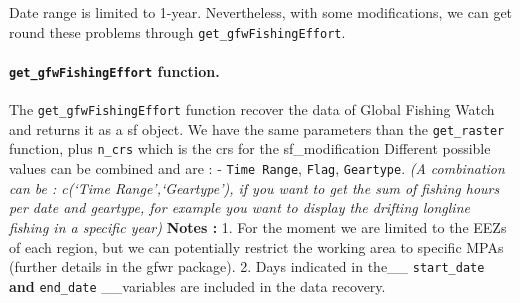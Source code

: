 \documentclass[
]{article}
\begin{document}
Date range is limited to 1-year. Nevertheless, with some modifications,
we can get round these problems through \texttt{get\_gfwFishingEffort}.

\hypertarget{get_gfwfishingeffort-function.}{%
\paragraph{\texorpdfstring{\texttt{get\_gfwFishingEffort}
function.}{get\_gfwFishingEffort function.}}\label{get_gfwfishingeffort-function.}}

The \texttt{get\_gfwFishingEffort} function recover the data of Global
Fishing Watch and returns it as a sf object. We have the same parameters
than the \texttt{get\_raster} function, plus \texttt{n\_crs} which is
the crs for the sf\_modification Different possible values can be
combined and are : - \texttt{Time\ Range}, \texttt{Flag},
\texttt{Geartype}. \emph{(A combination can be : c(`Time
Range',`Geartype'), if you want to get the sum of fishing hours per date
and geartype, for example you want to display the drifting longline
fishing in a specific year)} \textbf{Notes :} 1. For the moment we are
limited to the EEZs of each region, but we can potentially restrict the
working area to specific MPAs (further details in the gfwr package). 2.
Days indicated in the\_\_ \texttt{start\_date} \textbf{and}
\texttt{end\_date} \_\_variables are included in the data recovery.
\end{document}
